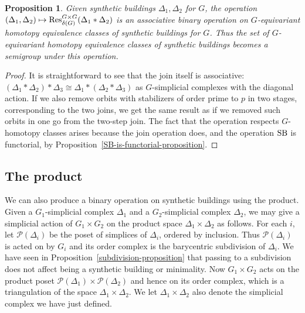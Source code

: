 \documentclass[12pt]{amsart}
\theoremstyle{plain}
\newtheorem{proposition}[theorem]{Proposition}
\theoremstyle{definition}
\theoremstyle{remark}
\numberwithin{equation}{section}
\def\calP{{\mathcal P}}
\DeclareMathOperator \Res{\mathop{\rm Res}\nolimits}
\DeclareMathOperator \SB{\mathop{\rm SB}\nolimits}
\begin{document}
\begin{proposition}
    Given synthetic buildings $\Delta_1,\Delta_2$ for $G$, the operation $(\Delta_1,\Delta_2)\mapsto \Res_{\delta(G)}^{G\times G}(\Delta_1*\Delta_2)$ is an associative binary operation on $G$-equivariant homotopy equivalence classes of synthetic buildings for $G$. Thus the set of $G$-equivariant homotopy equivalence classes of synthetic buildings becomes a semigroup under this operation.
\end{proposition}

\begin{proof}
    It is straightforward to see that the join itself is associative: $(\Delta_1*\Delta_2)*\Delta_3\cong \Delta_1*(\Delta_2*\Delta_3)$ as $G$-simplicial complexes with the diagonal action. If we also remove orbits with stabilizers of order prime to $p$ in two stages, corresponding to the two joins, we get the same result as if we removed such orbits in one go from the two-step join. The fact that the operation respects $G$-homotopy classes arises because the join operation does, and the operation $\SB$ is functorial, by Proposition~\ref{SB-is-functorial-proposition}.
\end{proof}


\subsection{The product}
We can also produce a binary operation on synthetic buildings using the product. 
Given a $G_1$-simplicial complex $\Delta_1$ and a $G_2$-simplicial complex $\Delta_2$, we may give a simplicial action of $G_1\times G_2$ on the product space $\Delta_1\times \Delta_2$ as follows.
For each $i$, let $\calP(\Delta_i)$ be the poset of simplices of $\Delta_i$, ordered by inclusion. Thus $\calP(\Delta_i)$ is acted on by $G_i$ and its order complex is the barycentric subdivision of $\Delta_i$. We have seen in Proposition~\ref{subdivision-proposition} that passing to a subdivision does not affect being a synthetic building or minimality. Now $G_1\times G_2$ acts on the product poset $\calP(\Delta_1)\times \calP(\Delta_2)$ and hence on its order complex, which is a triangulation of the space $\Delta_1\times\Delta_2$. We let $\Delta_1\times\Delta_2$ also denote the simplicial complex we have just defined.
\end{document}
